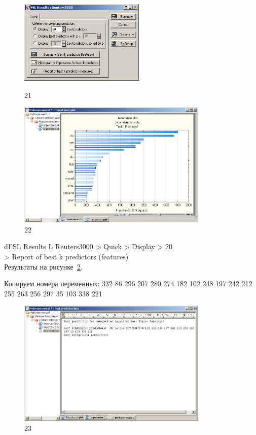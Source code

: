\begin{figure}[!h]
  \centering

  \begin{minipage}{0.29\textwidth}
    \centering

    \includegraphics[height=4cm]
    {inc/21.PNG}

    \caption{21}

    \label{fig:21}
  \end{minipage}
  \begin{minipage}{0.69\textwidth}
    \centering

    \includegraphics[height=6cm]
    {inc/22.PNG}

    \caption{22}

    \label{fig:22}
  \end{minipage}
\end{figure}

\newpage

dFSL Results L Reuters3000 > Quick > Display > 20 \\
> Report of best k predictors (features) \\

Результаты на рисунке~\ref{fig:23}.

Копируем номера переменных:
332 86 296 207 280 274 182 102 248 197 242 212 255 263 256 297 35 103 338 221

\begin{figure}[!h]
  \centering

  \includegraphics[height=6cm]
  {inc/23.PNG}

  \caption{23}

  \label{fig:23}
\end{figure}

